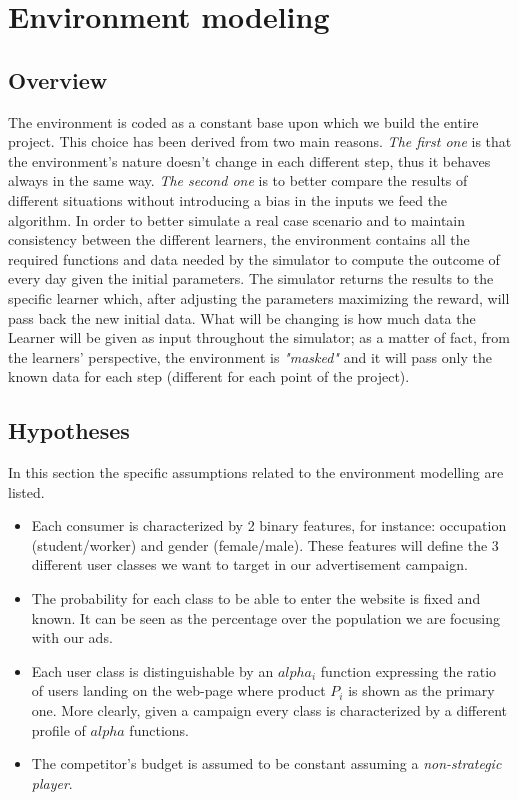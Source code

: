 \chapter{Environment modeling}

\section{Overview}
\label{chap:env_overview}

The environment is coded as a constant base upon which we build the entire project. This choice has been derived from two main reasons. \textit{The first one} is that the environment's nature doesn't change in each different step, thus it behaves always in the same way. \textit{The second one} is to better compare the results of different situations without introducing a bias in the inputs we feed the algorithm.
In order to better simulate a real case scenario and to maintain consistency between the different learners, the environment contains all the required functions and data needed by the simulator to compute the outcome of every day given the initial parameters. The simulator returns the results to the specific learner which, after adjusting the parameters maximizing the reward, will pass back the new initial data.
What will be changing is how much data the Learner will be given as input throughout the simulator; as a matter of fact, from the learners' perspective, the environment is \textit{"masked"} and it will pass only the known data for each step (different for each point of the project).

\section{Hypotheses}
\label{sec:env_hypoteses}

In this section the specific assumptions related to the environment modelling are listed.

\begin{itemize}
    \item Each consumer is characterized by 2 binary features, for instance: occupation (student/worker) and gender (female/male). These features will define the 3 different user classes we want to target in our advertisement campaign.
    \item The probability for each class to be able to enter the website is fixed and known. It can be seen as the percentage over the population we are focusing with our ads.
    \item Each user class is distinguishable by an $alpha_i$ function expressing the ratio of users landing on the web-page where product $P_i$ is shown as the primary one. More clearly, given a campaign every class is characterized by a different profile of $alpha$ functions.
    \item The competitor's budget is assumed to be constant assuming a \textit{non-strategic player}.
\end{itemize}


